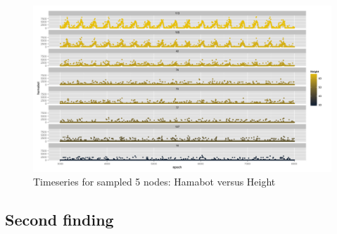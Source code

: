 \documentclass[english]{article}\usepackage[]{graphicx}\usepackage[]{color}
\begin{document}
\begin{figure}[H]

\includegraphics[width=\linewidth]{samplehama}
\caption{Timeseries for sampled 5 nodes: Hamabot versus Height}

\end{figure}


\subsection{Second finding}
\end{document}
